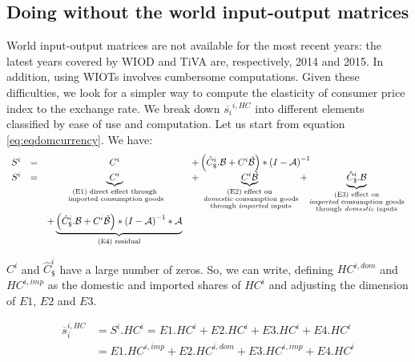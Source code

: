 \documentclass[11pt,a4paper]{article}
\begin{document}
\subsection{Doing without the world input-output matrices}
World input-output matrices are not available for the most recent years: the latest years covered by WIOD and TiVA are, respectively, 2014 and 2015. 
In addition, using WIOTs involves cumbersome computations.
Given these difficulties, we look for a simpler way to compute the elasticity of consumer price index to the exchange rate.
We break down $\overline{s_{i}}^{i,HC}$ into different elements classified by ease of use and computation.
Let us start from equation \ref{eq:eqdomcurrency}.
We have:
\begin{equation}
\begin{array}{lccl}
	S^ i&=&C^i	&+ \left(\hat{C}^i_\$.{\cal B}+{C^i}{\tilde{{\cal B}}}\right)*{{(I-{\cal A})}^{-1}} \\
	S^i &=&\underbrace{C^i}_{\substack{\text{(E1) direct effect through} \\ \text{ imported consumption goods}}}&+ \underbrace{{C^i}{\tilde{{\cal B}}}}_{\substack{\text{(E2) effect on} \\ \text{ \emph{domestic} consumption goods} \\ \text{ through \emph{imported} inputs}}}  + \underbrace{\hat{C}^i_\$.{\cal B}}_{\substack{\text{(E3)  effect on} \\ \text{\emph{imported} consumption goods} \\ \text{through \emph{domestic} inputs}}} \\ &&+\underbrace {\left( \hat{C}^i_\$.{\cal B} + {C^i}{\tilde{{\cal B}}}\right)*{{(I-{\cal A})}^{-1}}*{\cal A}}_{\text{(E4) residual}} \\
\end{array}
\label{eq:decomp}
\end{equation}


$C^i$ and $\hat{C}^i_\$$ have a large number of zeros. So, we can write, defining $HC^{i,dom}$ and $HC^{i,imp}$ as the domestic and imported shares of $HC^i$ and adjusting the dimension of $E1$, $E2$ and $E3$.

\begin{equation}
\begin{array}{lccl}
\overline{s}_{i}^{i,HC}&=S^i.HC^i=E1.HC^i+E2.HC^i+E3.HC^i+E4.HC^i \\
&=E1.HC^{i,imp}+E2.HC^{i,dom}+E3.HC^{i,imp}+E4.HC^i
 \end{array} 
 \label{eq:eqtoto}
 \end{equation}
 
\end{document}
